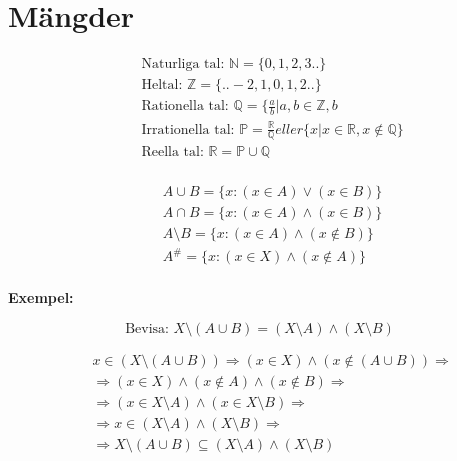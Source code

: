 \documentclass{article}
\begin{document}
\newpage

\section{Mängder}
\begin{align*}
  &\quad \text{Naturliga tal: } \mathbb{N} = \{0, 1, 2 , 3 ..  \} \\
  &\quad \text{Heltal: }\mathbb{Z} = \{.. -2, 1, 0, 1, 2 ..  \} \\
  &\quad \text{Rationella tal: }\mathbb{Q} = \{ \frac{a}{b} | a,b \in \mathbb{Z}, b \\
  &\quad \text{Irrationella tal: }\mathbb{P} = \frac{\mathbb{R}}{\mathbb{Q}}eller \{ x | x \in \mathbb{R}, x \notin \mathbb{Q} \} \\
  &\quad \text{Reella tal: }\mathbb{R} =  \mathbb{P} \cup \mathbb{Q} \\
\end{align*}

\begin{align*}
  &\quad A \cup B = \{ x:(x \in A) \lor (x \in B)\} \\
  &\quad A \cap B = \{ x:(x \in A) \land (x \in B)\} \\
  &\quad A \setminus B = \{ x:(x \in A) \land (x \notin B)\} \\
  &\quad A^{\text{\#}} = \{ x:(x \in X) \land (x \notin A)\} \\
\end{align*}

\textbf{Exempel:}\par
\begin{equation}
  \text{Bevisa: } X \setminus (A \cup B) = (X \setminus A) \land (X \setminus B) 
\end{equation}

\begin{align*}
  &\quad x \in (X \setminus (A \cup B)) \Rightarrow (x \in X) \land (x \notin (A \cup B)) \Rightarrow \\
  &\quad \Rightarrow (x \in X) \land (x \notin A) \land (x \notin B) \Rightarrow \\
  &\quad \Rightarrow (x \in X \setminus A) \land (x \in X \setminus B) \Rightarrow \\
  &\quad \Rightarrow x \in (X \setminus A) \land (X \setminus B) \Rightarrow \\
  &\quad \Rightarrow X \setminus (A \cup B) \subseteq (X \setminus A) \land (X \setminus B) \\
\end{align*}
\end{document}
